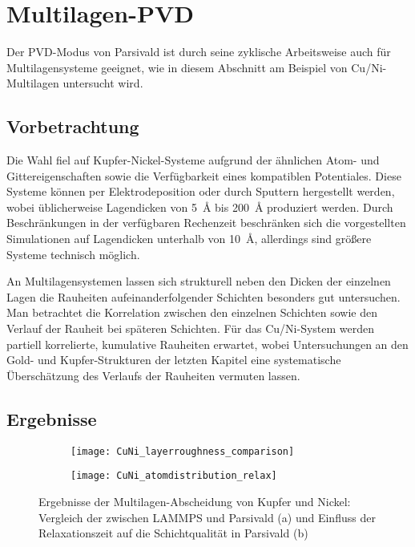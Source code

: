 \section{Multilagen-PVD}
\label{multilayer}

Der PVD-Modus von Parsivald ist durch seine zyklische Arbeitsweise auch für Multilagensysteme geeignet, wie in diesem Abschnitt am Beispiel von Cu/Ni-Multilagen untersucht wird.

\subsection{Vorbetrachtung}
Die Wahl fiel auf Kupfer-Nickel-Systeme aufgrund der ähnlichen Atom- und Gittereigenschaften sowie die Verfügbarkeit eines kompatiblen Potentiales.
Diese Systeme können per Elektro\-deposition oder durch Sputtern hergestellt werden, wobei üblicherweise Lagendicken von \SI{5}{\angstrom} bis \SI{200}{\angstrom} produziert werden.
Durch Beschränkungen in der verfügbaren Rechenzeit beschränken sich die vorgestellten Simulationen auf Lagendicken unterhalb von \SI{10}{\angstrom}, allerdings sind größere Systeme technisch möglich.

An Multilagensystemen lassen sich strukturell neben den Dicken der einzelnen Lagen die Rauheiten aufeinanderfolgender Schichten besonders gut untersuchen.
Man betrachtet die Korrelation zwischen den einzelnen Schichten sowie den Verlauf der Rauheit bei späteren Schichten.
Für das Cu/Ni-System werden partiell korrelierte, kumulative Rauheiten erwartet, wobei Untersuchungen an den Gold- und Kupfer-Strukturen der letzten Kapitel eine systematische Überschätzung des Verlaufs der Rauheiten vermuten lassen.

\subsection{Ergebnisse}

\begin{figure}[H]
  \captionsetup[subfigure]{singlelinecheck=false}
  \def\subfigwidth{7cm}
  \begin{subfigure}[t]{\subfigwidth}
    \texttt{[image: CuNi\_layerroughness\_comparison]}
  \end{subfigure}
  \hfill
  \begin{subfigure}[t]{\subfigwidth}
    \texttt{[image: CuNi\_atomdistribution\_relax]}
  \end{subfigure}
  \caption[Ergebnisse der Multilagen-Abscheidung von Kupfer und Nickel]{
    Ergebnisse der Multilagen-Abscheidung von Kupfer und Nickel:
    Vergleich der zwischen LAMMPS und Parsivald (a) und Einfluss der Relaxationszeit auf die Schichtqualität in Parsivald (b)
  }
  \label{fig:multilayerplots}
\end{figure}

